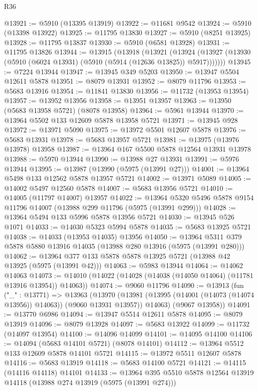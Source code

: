 \begin{lexlean}{R36}
\begin{coremodule}
@13921 := @5910 (@13395 @13919)
@13922 := @11681 @9542
@13924 := @5910 (@13398 @13922)
@13925 := @11795 @13830
@13927 := @5910 (@8251 @13925)
@13928 := @11795 @13837
@13930 := @5910 (@6581 @13928)
@13931 := @11795 @13826
@13944 := @13915
    (@13918
      (@13921
        (@13924 (@13927 (@13930 (@5910 (@6024 @13931) (@5910 (@5914 (@12636 @13825)) @5917)))))))
@13945 := @7224 @13944
@13947 := @13945 @349 @5203
@13950 := @13947 @5504 @12611 @5878
@13951 := @8079 @13931
@13952 := @8079 @11796
@13953 := @5683 @13916
@13954 := @11841 @13830
@13956 := @11732 (@13953 @13954)
@13957 := @13952 @13956
@13958 := @13951 @13957
@13963 := @13950 (@5683 @13958 @5721) (@8078 @13958)
@13964 := @5961 @13944
@13970 := @13964 @5502 @133 @12609 @5878 @13958 @5721
@13971 := @13945 @928
@13972 := @13971 @5090
@13975 := @13972 @5501 @12607 @5878
@13976 := @5683 @13931
@13978 := @5683 @13957 @5721
@13981 := @13975 (@13976 @13978) @13958
@13987 := @13964 @167 @5500 @5878 @12564 @13931 @13978
@13988 := @5970 @13944
@13990 := @13988 @27 @13931
@13991 := @5976 @13944
@13995 := @13987 (@13990 (@5975 (@13991 @27)))
@14001 := @13964 @5498 @133 @12562 @5878 @13957 @5721
@14002 := @13971 @5089
@14005 := @14002 @5497 @12560 @5878
@14007 := @5683 @13956 @5721
@14010 := @14005 (@11797 @14007) @13957
@14022 := @13964 @5320 @5496 @5878 @9154 @11796 @14007 (@13988 @299 @11796 (@5975 (@13991 @299)))
@14028 := @13964 @5494 @133 @5996 @5878 @13956 @5721
@14030 := @13945 @526 @1071
@14033 := @14030 @5323 @5994 @5878
@14035 := @5683 @13925 @5721
@14038 := @14033 (@13953 @14035) @13956
@14050 := @13964 @5311 @379 @5878 @5880 @13916 @14035 (@13988 @280 @13916 (@5975 (@13991 @280)))
@14062 := @13964 @377 @133 @5878 @5878 @13925 @5721 (@13988 @42 @13925 (@5975 (@13991 @42)))
@14063 := @5983 @13944
@14064 := @14062 @14063
@14073 := @14010 (@14022 (@14028 (@14038 (@14050 @14064) (@11781 @13916 @13954)) @14063))
@14074 := @9060 @11796
@14090 := @13913
    (fun ("_" : @13771) =>
    @13963
      (@13970
        (@13981 (@13995 (@14001 (@14073 (@14074 @13956)) @14063)) (@9060 @13931 @13957))
        @14063)
      (@9067 @13958))
@14091 := @13770 @6986
@14094 := @13947 @5514 @12611 @5878
@14095 := @8079 @13919
@14096 := @8079 @13928
@14097 := @5683 @13922
@14099 := @11732 (@14097 @13954)
@14100 := @14096 @14099
@14101 := @14095 @14100
@14106 := @14094 (@5683 @14101 @5721) (@8078 @14101)
@14112 := @13964 @5512 @133 @12609 @5878 @14101 @5721
@14115 := @13972 @5511 @12607 @5878
@14116 := @5683 @13919
@14118 := @5683 @14100 @5721
@14121 := @14115 (@14116 @14118) @14101
@14133 := @13964 @395 @5510 @5878 @12564 @13919 @14118 (@13988 @274 @13919 (@5975 (@13991 @274)))

\end{coremodule}
\end{lexlean}
